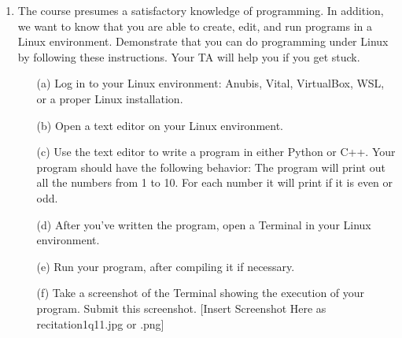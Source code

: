 \documentclass{article}
\begin{document}
\begin{enumerate}
    \item The course presumes a satisfactory knowledge of programming. In addition, we want to know that you are able to create, edit, and run programs in a Linux environment. Demonstrate that you can do programming under Linux by following these instructions. Your TA will help you if you get stuck.
    \begin{itemize}
        \item[(a)] Log in to your Linux environment: Anubis, Vital, VirtualBox, WSL, or a proper Linux installation.
        \item[(b)] Open a text editor on your Linux environment.
        \item[(c)] Use the text editor to write a program in either Python or C++. Your program should have the following behavior: The program will print out all the numbers from 1 to 10. For each number it will print if it is even or odd.
        \item[(d)] After you’ve written the program, open a Terminal in your Linux environment.
        \item[(e)] Run your program, after compiling it if necessary.
        \item[(f)] Take a screenshot of the Terminal showing the execution of your program. Submit this screenshot. [Insert Screenshot Here as recitation1q11.jpg or .png]
    \end{itemize}
\end{enumerate}
\end{document}

